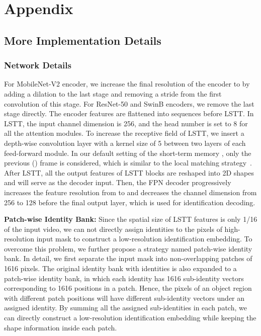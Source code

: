 \documentclass{article}
\begin{document}
{


}

\newpage
\appendix

\section{Appendix}

\subsection{More Implementation Details}
\subsubsection{Network Details}
For MobileNet-V2 encoder, we increase the final resolution of the encoder to  by adding a dilation to the last stage and removing a stride from the first convolution of this stage. For ResNet-50 and SwinB encoders, we remove the last stage directly. The encoder features are flattened into sequences before LSTT. In LSTT, the input channel dimension is 256, and the head number is set to 8 for all the attention modules. To increase the receptive field of LSTT, we insert a depth-wise convolution layer with a kernel size of 5 between two layers of each feed-forward module. In our default setting of the short-term memory , only the previous () frame is considered, which is similar to the local matching strategy~\cite{feelvos,cfbi}. After LSTT, all the output features of LSTT blocks are reshaped into 2D shapes and will serve as the decoder input. Then, the FPN decoder progressively increases the feature resolution from  to  and decreases the channel dimension from 256 to 128 before the final output layer, which is used for identification decoding.

\noindent\textbf{Patch-wise Identity Bank:} Since the spatial size of LSTT features is only 1/16 of the input video, we can not directly assign identities to the pixels of high-resolution input mask to construct a low-resolution identification embedding. To overcome this problem, we further propose a strategy named patch-wise identity bank. In detail, we first separate the input mask into non-overlapping patches of 1616 pixels. The original identity bank with  identities is also expanded to a patch-wise identity bank, in which each identity has 1616 sub-identity vectors corresponding to 1616 positions in a patch. Hence, the pixels of an object region with different patch positions will have different sub-identity vectors under an assigned identity. By summing all the assigned sub-identities in each patch, we can directly construct a low-resolution identification embedding while keeping the shape information inside each patch. 
\end{document}
